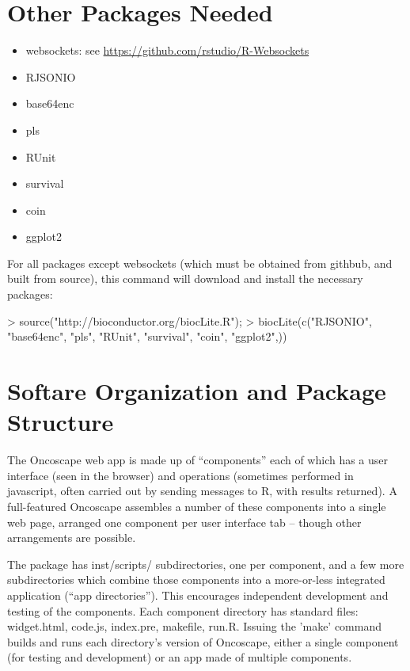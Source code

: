 \documentclass{article}
\renewenvironment{Schunk}{\vspace{\topsep}}{\vspace{\topsep}}
\begin{document}
\section{Other Packages Needed}

\begin{itemize}
    \item websockets:  see \url{https://github.com/rstudio/R-Websockets}
    \item RJSONIO
    \item base64enc
    \item pls
    \item RUnit
    \item survival
    \item coin
    \item ggplot2
\end{itemize}

For all packages except websockets (which must be obtained from githbub, and built from source), 
this command will download and install the necessary packages:
\begin{Schunk}
\begin{Sinput}
> source("http://bioconductor.org/biocLite.R");
> biocLite(c("RJSONIO", "base64enc", "pls", "RUnit", "survival", "coin", "ggplot2",))
\end{Sinput}
\end{Schunk}

\section{Softare Organization and Package Structure}

The Oncoscape web app is made up of ``components'' each of which has a user interface (seen in the browser) and operations 
(sometimes performed in javascript, often carried out by sending messages to R, with results returned).  A full-featured Oncoscape assembles
a number of these components into a single web page, arranged one component per user interface tab -- though other arrangements
are possible.

The package has  inst/scripts/ subdirectories, one per component, and a few more subdirectories which combine those components
into a more-or-less integrated application (``app directories'').  This encourages independent development and testing
of the components.  Each component directory has standard files:  widget.html, code.js, index.pre, makefile, run.R.  
Issuing the 'make' command builds and runs each directory's  version of Oncoscape, either a single component
(for testing and development) or an app made of multiple components.
\end{document}
